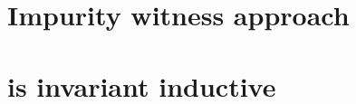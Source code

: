 \documentclass{llncs}
\newcommand{\foo}{\textit{foo}}
\newcommand{\inv}{\mathit{inv}}
\newcommand{\pathCondition}{\mathit{T_{\foo}}}
\newcommand{\OPCheckE}{\mathit{OPCheck \mhyphen existential}}
\newcommand{\mi}[1]{\mathit{#1}}
\newcommand{\retVar}{\textit{retVar}}
\newcommand{\F}{\mathit{F}}
\newcommand{\n}{\textit{n}}
\newcommand{\g}{\textit{g}}
\newcommand{\gout}{\textit{gout}}
\newcommand{\gbef}{\textit{gbef}}
\newcommand{\gaft}{\textit{gaft}}
\begin{document}

\section{Impurity witness approach}
\section{is invariant inductive}

\end{document}
